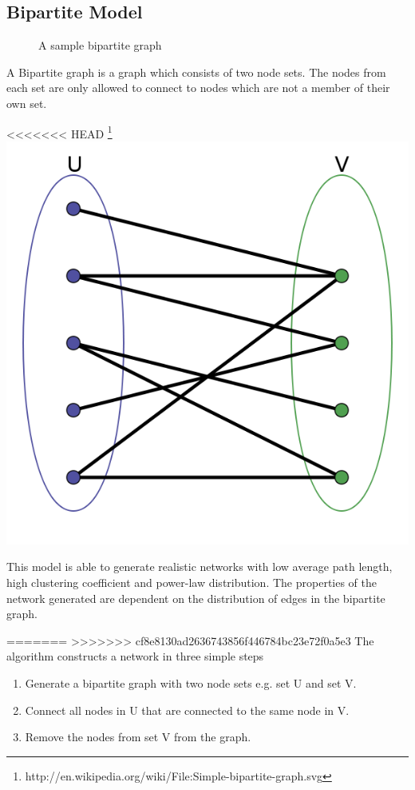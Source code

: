 \documentclass[a4paper,11pt,titlepage]{article}
\begin{document}
\subsection{Bipartite Model}

\begin{figure}
  \begin{center}
    
  \end{center}
  \caption{A sample bipartite graph}
\end{figure}

A Bipartite graph is a graph which consists of two node sets. The nodes from
each set are only allowed to connect to nodes which are not a member of their
own set.

<<<<<<< HEAD
\footnote{http://en.wikipedia.org/wiki/File:Simple-bipartite-graph.svg}
\includegraphics[scale=0.3]{bipartite.png}

This model is able to generate realistic networks with low average path length,
high clustering coefficient and power-law distribution. The properties of the 
network generated are dependent on the distribution of edges in the bipartite 
graph.

=======
>>>>>>> cf8e8130ad2636743856f446784bc23e72f0a5e3
The algorithm constructs a network in three simple steps
\begin{enumerate}
   \item Generate a bipartite graph with two node sets e.g. set U and set V.
   \item Connect all nodes in U that are connected to the same node in V.
   \item Remove the nodes from set V from the graph.
\end{enumerate}
\end{document}
